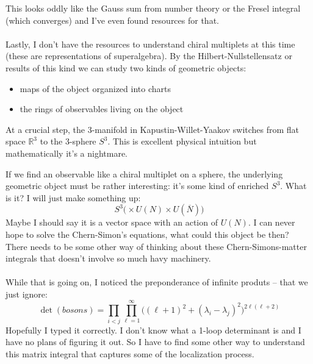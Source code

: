 \documentclass[12pt]{article}
\begin{document}
This looks oddly like the Gauss sum from number theory or the Fresel integral (which converges) and I've even found resources for that.  \\ \\
Lastly, I don't have the resources to understand chiral multiplets at this time (these are representations of superalgebra).  By the Hilbert-Nullstellensatz or results of this kind we can study two kinds of geometric objects:
\begin{itemize}
\item maps of the object organized into charts
\item the rings of observables living on the object
\end{itemize}
At a crucial step, the 3-manifold in Kapustin-Willet-Yaakov switches from flat space $\mathbb{R}^3$ to the 3-sphere $S^3$.  This is excellent physical intuition but mathematically it's a nightmare.

\newpage

\noindent If we find an observable like a chiral multiplet on a sphere, the underlying geometric object must be rather interesting: it's some kind of enriched $S^3$.  What is it?  I will just make something up:
$$ S^3  \Big( \times U(N) \times U(\overline{N}) \Big) $$
Maybe I should say it is a vector space with an action of $U(N)$.  I can never hope to solve the Chern-Simon's equations, what could this object be then?
There needs to be some other way of thinking about these Chern-Simons-matter integrals that doesn't involve so much havy machinery. \\ \\
While that is going on, I noticed the preponderance of infinite produts -- that we just ignore:
$$ \det (bosons) = \prod_{i < j} \prod_{\ell = 1}^\infty \Big( (\ell+1)^2 + (\lambda_i - \lambda_j)^2 \Big)^{2 \ell (\ell + 2)}  $$
Hopefully I typed it correctly. I don't know what a 1-loop determinant is and I have no plans of figuring it out. So I have to find some other way to understand this matrix integral that captures some of the localization process.

\newpage
\end{document}
